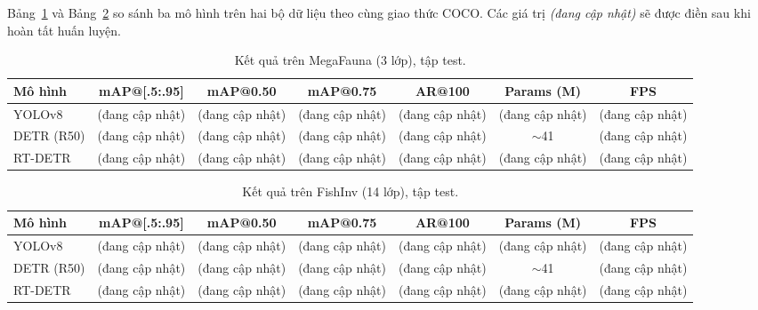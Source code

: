\documentclass[12pt]{article}
\numberwithin{equation}{section}
\begin{document}
Bảng~\ref{tab:res-mega} và Bảng~\ref{tab:res-fish} so sánh ba mô hình trên hai bộ dữ liệu
theo cùng giao thức COCO. Các giá trị \textit{(đang cập nhật)} sẽ được điền sau khi hoàn tất
huấn luyện.

\begin{table}[H]
\centering
\caption{Kết quả trên MegaFauna (3 lớp), tập test.}
\label{tab:res-mega}
\begin{adjustbox}{max width=\linewidth}
\begin{tabular}{l c c c c c c}
\toprule
\textbf{Mô hình} & \textbf{mAP@[.5:.95]} & \textbf{mAP@0.50} & \textbf{mAP@0.75} & \textbf{AR@100} & \textbf{Params (M)} & \textbf{FPS} \\
\midrule
YOLOv8     & (đang cập nhật) & (đang cập nhật) & (đang cập nhật) & (đang cập nhật) & (đang cập nhật) & (đang cập nhật) \\
DETR (R50) & (đang cập nhật) & (đang cập nhật) & (đang cập nhật) & (đang cập nhật) & $\sim$41 & (đang cập nhật) \\
RT-DETR    & (đang cập nhật) & (đang cập nhật) & (đang cập nhật) & (đang cập nhật) & (đang cập nhật) & (đang cập nhật) \\
\bottomrule
\end{tabular}
\end{adjustbox}
\end{table}

\begin{table}[H]
\centering
\caption{Kết quả trên FishInv (14 lớp), tập test.}
\label{tab:res-fish}
\begin{adjustbox}{max width=\linewidth}
\begin{tabular}{l c c c c c c}
\toprule
\textbf{Mô hình} & \textbf{mAP@[.5:.95]} & \textbf{mAP@0.50} & \textbf{mAP@0.75} & \textbf{AR@100} & \textbf{Params (M)} & \textbf{FPS} \\
\midrule
YOLOv8     & (đang cập nhật) & (đang cập nhật) & (đang cập nhật) & (đang cập nhật) & (đang cập nhật) & (đang cập nhật) \\
DETR (R50) & (đang cập nhật) & (đang cập nhật) & (đang cập nhật) & (đang cập nhật) & $\sim$41 & (đang cập nhật) \\
RT-DETR    & (đang cập nhật) & (đang cập nhật) & (đang cập nhật) & (đang cập nhật) & (đang cập nhật) & (đang cập nhật) \\
\bottomrule
\end{tabular}
\end{adjustbox}
\end{table}
\end{document}
